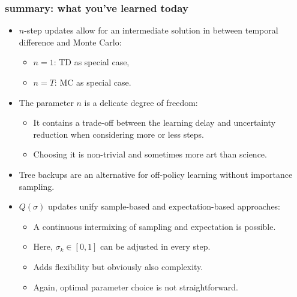\begin{frame}
\frametitle{summary: what you've learned today}
\begin{itemize}
	\item $n$-step updates allow for an intermediate solution in between temporal difference and Monte Carlo:
	\begin{itemize}
		\item $n=1$: TD as special case,
		\item $n=T$: MC as special case.
	\end{itemize}\pause
	\item The parameter $n$ is a delicate degree of freedom:
	\begin{itemize}
		\item It contains a trade-off between the learning delay and uncertainty reduction when considering more or less steps.
		\item Choosing it is non-trivial and sometimes more art than science.
	\end{itemize}\pause
	\item Tree backups are an alternative for off-policy learning without importance sampling.\pause
	\item $Q(\sigma)$ updates unify sample-based and expectation-based approaches:
	\begin{itemize}
		\item A continuous intermixing of sampling and expectation is possible.
		\item Here, $\sigma_k \in [0,1]$ can be adjusted in every step.
		\item Adds flexibility but obviously also complexity.
		\item Again, optimal parameter choice is not straightforward.
	\end{itemize}
\end{itemize}
\end{frame}